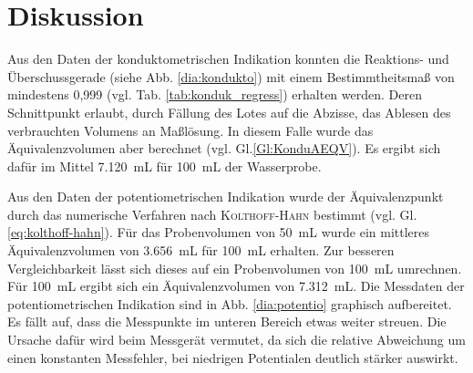 \newpage
\section{Diskussion}
\label{sec:diskussion}

%
%

Aus den  Daten der konduktometrischen Indikation konnten die Reaktions- und Überschussgerade (siehe Abb. \ref{dia:kondukto}) mit einem Bestimmtheitsmaß von mindestens 0,999 (vgl. Tab. \ref{tab:konduk_regress}) erhalten werden. Deren Schnittpunkt erlaubt, durch Fällung des Lotes auf die Abzisse, das Ablesen des verbrauchten Volumens an Maßlösung. In diesem Falle wurde das Äquivalenzvolumen aber berechnet (vgl. Gl.\eqref{Gl:KonduAEQV}). Es ergibt sich dafür im Mittel \SI{7,120}{\milli\liter} für \SI{100}{\milli\liter} der Wasserprobe. 

Aus den Daten der potentiometrischen Indikation wurde der Äquivalenzpunkt durch das numerische Verfahren nach \textsc{Kolthoff-Hahn} bestimmt (vgl. Gl. \eqref{eq:kolthoff-hahn}). Für das Probenvolumen von \SI{50}{\milli\liter} wurde ein mittleres Äquivalenzvolumen von \SI{3,656}{\milli\liter} für \SI{100}{\milli\liter} erhalten. Zur besseren Vergleichbarkeit lässt sich dieses auf ein Probenvolumen von \SI{100}{\milli\liter} umrechnen. Für \SI{100}{\milli\liter} ergibt sich ein Äquivalenzvolumen von \SI{7,312}{\milli\liter}. Die Messdaten der potentiometrischen Indikation sind in Abb. \ref{dia:potentio} graphisch aufbereitet. Es fällt auf, dass die Messpunkte im unteren Bereich etwas weiter streuen. Die Ursache dafür wird beim Messgerät vermutet, da sich die relative Abweichung um einen konstanten Messfehler, bei niedrigen Potentialen deutlich stärker auswirkt. 


